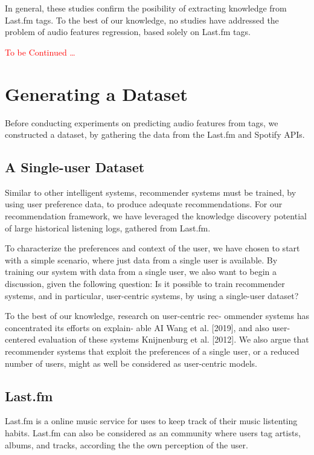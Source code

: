 \documentclass[sn-mathphys]{sn-jnl}%
\theoremstyle{thmstyleone}%
\theoremstyle{thmstyletwo}%
\theoremstyle{thmstylethree}%
\begin{document}
In general, these studies confirm the posibility of extracting knowledge from Last.fm tags.
To the best of our knowledge, no studies have addressed the problem of audio features regression, based solely on Last.fm tags.

\textcolor{red}{To be Continued \dots }

\section{Generating a Dataset}

Before conducting experiments on predicting audio features from tags, we constructed a dataset, by gathering the data from the Last.fm and Spotify APIs.

\subsection{A Single-user Dataset}

Similar to other intelligent systems, recommender systems
must be trained, by using user preference data, to produce
adequate recommendations. For our recommendation framework,
we have leveraged the knowledge discovery potential
of large historical listening logs, gathered from Last.fm.

To characterize the preferences and context of the user, we
have chosen to start with a simple scenario, where just data
from a single user is available. By training our system with
data from a single user, we also want to begin a discussion,
given the following question: Is it possible to train 
recommender systems, and in particular, user-centric systems, by
using a single-user dataset?

To the best of our knowledge, research on user-centric rec-
ommender systems has concentrated its efforts on explain-
able AI Wang et al. [2019], and also user-centered evaluation
of these systems Knijnenburg et al. [2012]. We also argue
that recommender systems that exploit the preferences of a
single user, or a reduced number of users, might as well be
considered as user-centric models.


\subsection{Last.fm}

Last.fm is a online music service for uses to keep track of their music listenting habits.
Last.fm can also be considered as an community where users tag artists, albums, and tracks, according the the own perception of the user.
\end{document}
